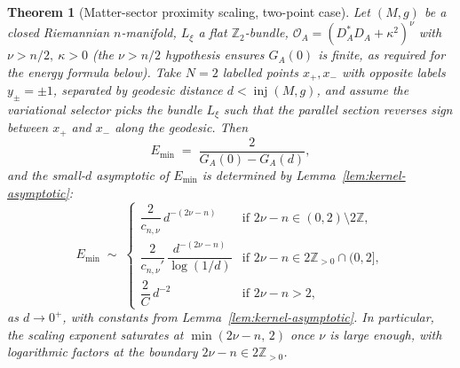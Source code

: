 \documentclass[10pt,a4paper]{amsart}
\newtheorem{theorem}{Theorem}
\newcommand{\Op}{\mathcal{O}}              %
\newcommand{\Z}{\mathbb{Z}}
\newcommand{\inj}{\operatorname{inj}}      %
\begin{document}
\begin{theorem}[Matter-sector proximity scaling, two-point case]
\label{thm:proximity-scaling-2pt}
Let $(M,g)$ be a closed Riemannian $n$-manifold, $L_\xi$ a flat
$\Z_2$-bundle, $\Op_A=(D_A^*D_A+\kappa^2)^\nu$ with $\nu>n/2,\
\kappa>0$ (the $\nu>n/2$ hypothesis ensures $G_A(0)$ is finite, as
required for the energy formula below). Take $N=2$ labelled points
$x_+,x_-$ with opposite labels $y_\pm=\pm 1$, separated by geodesic
distance $d<\inj(M,g)$, and assume the variational selector picks
the bundle $L_\xi$ such that the parallel section reverses sign
between $x_+$ and $x_-$ along the geodesic. Then
\[
   E_{\min} \;=\; \frac{2}{G_A(0)-G_A(d)},
\]
and the small-$d$ asymptotic of $E_{\min}$ is determined by
Lemma~\ref{lem:kernel-asymptotic}:
\[
   E_{\min} \;\sim\;
   \begin{cases}
      \dfrac{2}{c_{n,\nu}}\,d^{-(2\nu-n)}
      & \text{if } 2\nu-n\in(0,2)\setminus 2\Z, \\[6pt]
      \dfrac{2}{c_{n,\nu}'}\,\dfrac{d^{-(2\nu-n)}}{\log(1/d)}
      & \text{if } 2\nu-n\in 2\Z_{>0}\cap(0,2], \\[8pt]
      \dfrac{2}{C}\,d^{-2}
      & \text{if } 2\nu-n>2,
   \end{cases}
\]
as $d\to 0^+$, with constants from
Lemma~\ref{lem:kernel-asymptotic}. In particular, the scaling
exponent saturates at $\min(2\nu-n,\,2)$ once $\nu$ is large enough,
with logarithmic factors at the boundary $2\nu-n\in 2\Z_{>0}$.
\end{theorem}
\end{document}
